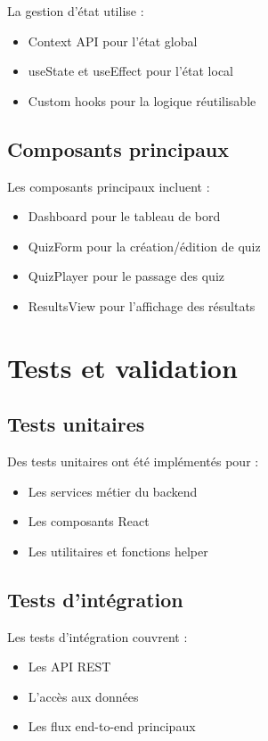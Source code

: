\documentclass[12pt,a4paper]{report}
\begin{document}
La gestion d'état utilise :

\begin{itemize}
    \item Context API pour l'état global
    \item useState et useEffect pour l'état local
    \item Custom hooks pour la logique réutilisable
\end{itemize}

\subsection{Composants principaux}

Les composants principaux incluent :

\begin{itemize}
    \item Dashboard pour le tableau de bord
    \item QuizForm pour la création/édition de quiz
    \item QuizPlayer pour le passage des quiz
    \item ResultsView pour l'affichage des résultats
\end{itemize}

\section{Tests et validation}

\subsection{Tests unitaires}

Des tests unitaires ont été implémentés pour :

\begin{itemize}
    \item Les services métier du backend
    \item Les composants React
    \item Les utilitaires et fonctions helper
\end{itemize}

\subsection{Tests d'intégration}

Les tests d'intégration couvrent :

\begin{itemize}
    \item Les API REST
    \item L'accès aux données
    \item Les flux end-to-end principaux
\end{itemize}
\end{document}
